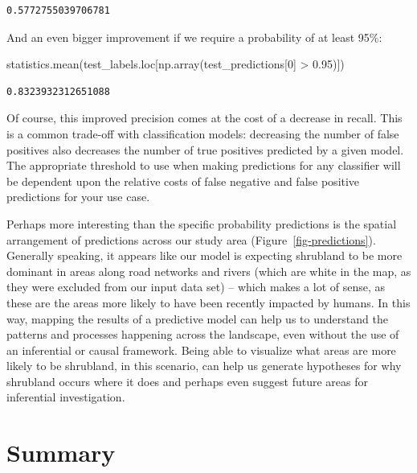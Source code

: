 \documentclass[
  letterpaper,
  DIV=11,
  numbers=noendperiod]{scrartcl}
\newenvironment{Shaded}{\begin{snugshade}}{\end{snugshade}}
\newcommand{\DecValTok}[1]{\textcolor[rgb]{0.68,0.00,0.00}{#1}}
\newcommand{\FloatTok}[1]{\textcolor[rgb]{0.68,0.00,0.00}{#1}}
\newcommand{\NormalTok}[1]{\textcolor[rgb]{0.00,0.23,0.31}{#1}}
\newcommand{\OperatorTok}[1]{\textcolor[rgb]{0.37,0.37,0.37}{#1}}
\begin{document}
\begin{verbatim}
0.5772755039706781
\end{verbatim}

And an even bigger improvement if we require a probability of at least
95\%:

\begin{Shaded}
\begin{Highlighting}[]
\NormalTok{statistics.mean(test\_labels.loc[np.array(test\_predictions[}\DecValTok{0}\NormalTok{] }\OperatorTok{\textgreater{}} \FloatTok{0.95}\NormalTok{)])}
\end{Highlighting}
\end{Shaded}

\begin{verbatim}
0.8323932312651088
\end{verbatim}

Of course, this improved precision comes at the cost of a decrease in
recall. This is a common trade-off with classification models:
decreasing the number of false positives also decreases the number of
true positives predicted by a given model. The appropriate threshold to
use when making predictions for any classifier will be dependent upon
the relative costs of false negative and false positive predictions for
your use case.

Perhaps more interesting than the specific probability predictions is
the spatial arrangement of predictions across our study area
(Figure~\ref{fig-predictions}). Generally speaking, it appears like our
model is expecting shrubland to be more dominant in areas along road
networks and rivers (which are white in the map, as they were excluded
from our input data set) -- which makes a lot of sense, as these are the
areas more likely to have been recently impacted by humans. In this way,
mapping the results of a predictive model can help us to understand the
patterns and processes happening across the landscape, even without the
use of an inferential or causal framework. Being able to visualize what
areas are more likely to be shrubland, in this scenario, can help us
generate hypotheses for why shrubland occurs where it does and perhaps
even suggest future areas for inferential investigation.

\hypertarget{summary}{%
\section{Summary}\label{summary}}
\end{document}
